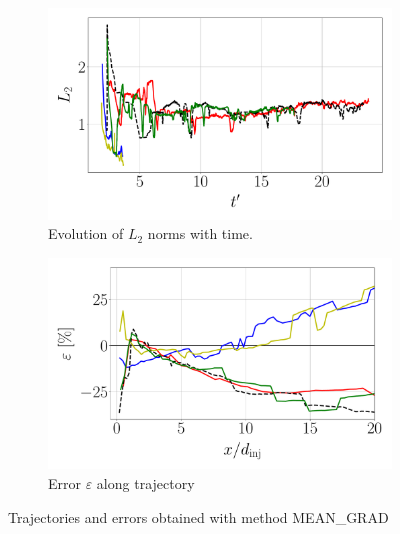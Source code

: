 \begin{figure}[ht]
\begin{subfigure}[b]{0.45\textwidth}
	\centering
   \includegraphics[scale=0.25]{./part2_developments/figures_ch5_resolved_JICF/results_trajectories/methods_expe_validation_L2_evolution.pdf}
   \vspace*{-0.25in}
   \caption{Evolution of $L_2$ norms with time.}
\end{subfigure}
\hspace{0.25in}
\begin{subfigure}[b]{0.45\textwidth}
	\centering
   \includegraphics[scale=0.25]{./part2_developments/figures_ch5_resolved_JICF/results_trajectories/methods_expe_validation_error_with_xD.pdf}
   \vspace*{-0.30in}
   \caption{Error $\varepsilon$ along trajectory}
\end{subfigure}


\caption{Trajectories and errors obtained with method MEAN\_GRAD}
\label{fig:JICF_trajectories_validation}
\end{figure}

